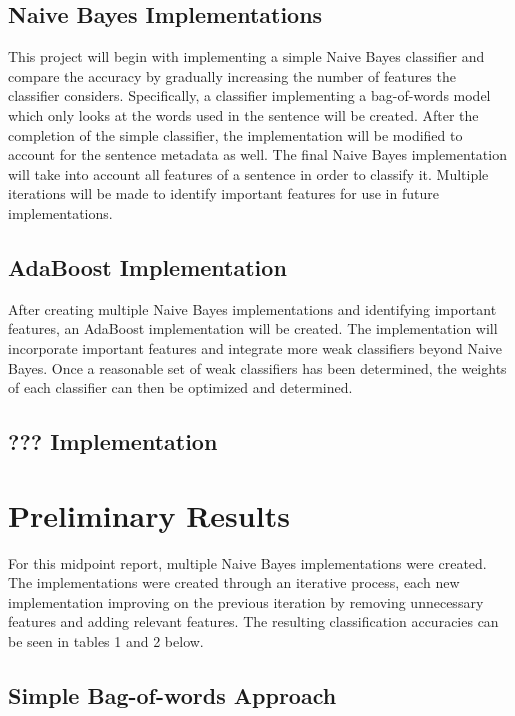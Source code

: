 \documentclass{article} %
\begin{document}
\subsection{Naive Bayes Implementations}

This project will begin with implementing a simple Naive Bayes classifier and compare the accuracy by gradually increasing the number of features the classifier considers. Specifically, a classifier implementing a bag-of-words model which only looks at the words used in the sentence will be created. After the completion of the simple classifier, the implementation will be modified to account for the sentence metadata as well. The final Naive Bayes implementation will take into account all features of a sentence in order to classify it. Multiple iterations will be made to identify important features for use in future implementations.

\subsection{AdaBoost Implementation}

After creating multiple Naive Bayes implementations and identifying important features, an AdaBoost implementation will be created. The implementation will incorporate important features and integrate more weak classifiers beyond Naive Bayes. Once a reasonable set of weak classifiers has been determined, the weights of each classifier can then be optimized and determined.

\subsection{??? Implementation}

\section{Preliminary Results}

For this midpoint report, multiple Naive Bayes implementations were created. The implementations were created through an iterative process, each new implementation improving on the previous iteration by removing unnecessary features and adding relevant features. The resulting classification accuracies can be seen in tables 1 and 2 below.

\subsection{Simple Bag-of-words Approach}
\end{document}
